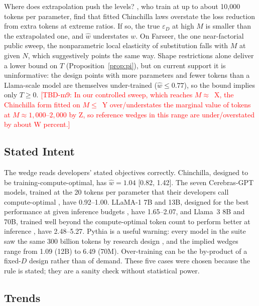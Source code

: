 Where does extrapolation push the levels? \citet{sardana2024beyond}, who train at up to about 10,000 tokens per
parameter, find that fitted Chinchilla laws overstate the loss reduction from extra tokens at extreme ratios. If so, the
true $\varepsilon_D$ at high $M$ is smaller than the extrapolated one, and $\hat w$ understates $w$. On Farseer, the one
near-factorial public sweep, the nonparametric local elasticity of substitution falls with $M$ at given $N$, which
suggestively points the same way. Shape restrictions alone deliver a lower bound on $T$ (Proposition~\ref{prop:pi}), but
on current support it is uninformative: the design points with more parameters and fewer tokens than a Llama-scale model
are themselves under-trained ($\hat w\le0.77$), so the bound implies only $T\ge0$.
\textcolor{red}{[TBD-m9: In our controlled sweep, which reaches $M\approx$~X, the Chinchilla form fitted on $M\le$~Y
over/understates the marginal value of tokens at $M\approx1{,}000$--$2{,}000$ by Z, so reference wedges in this range are
under/overstated by about W percent.]}

\subsection{Stated Intent}\label{sec:wedge-intent}

The wedge reads developers' stated objectives correctly. Chinchilla, designed to be training-compute-optimal, has $\hat
w=1.04$ [0.82, 1.42]. The seven Cerebras-GPT models, trained at the 20 tokens per parameter that their developers call
compute-optimal \citep{dey2023cerebras}, have 0.92--1.00. LLaMA-1 7B and 13B, designed for the best performance at given
inference budgets \citep{touvron2023llama}, have 1.65--2.07, and Llama~3 8B and 70B, trained well beyond the
compute-optimal token count to perform better at inference \citep{grattafiori2024llama}, have 2.48--5.27. Pythia is a
useful warning: every model in the suite saw the same 300 billion tokens by research design \citep{biderman2023pythia},
and the implied wedges range from 1.09 (12B) to 6.49 (70M). Over-training can be the by-product of a fixed-$D$ design
rather than of demand. These five cases were chosen because the rule is stated; they are a sanity check without
statistical power.

\subsection{Trends}\label{sec:wedge-trends}

